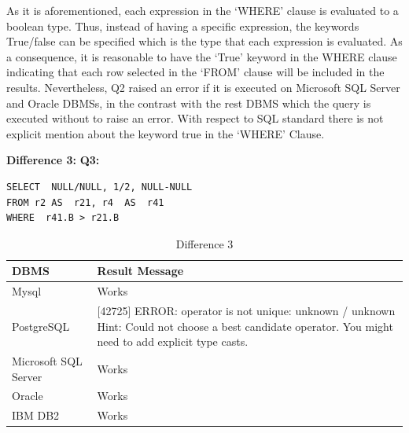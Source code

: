 As it is aforementioned, each expression in the ‘WHERE’ clause is evaluated to a boolean type. Thus, instead of having a specific expression, the keywords True/false can be specified which is the type that each expression is evaluated. As a consequence, it is reasonable to have the ‘True’ keyword in the WHERE clause indicating that each row selected in the ‘FROM’ clause will be included in the results. Nevertheless, Q2 raised an error if it is executed on Microsoft SQL  Server and Oracle DBMSs, in the contrast with the rest DBMS which the query is executed without to raise an error. With respect to SQL standard there is not explicit mention about the keyword true in the ‘WHERE’ Clause. 

\hfill\newpage

\hfill\newline\textbf{Difference 3:}
\hfill\newline\textbf{Q3:}
\begin{mdframed}[backgroundcolor=lightgray!20]
\begin{lstlisting}[style=SQL]
SELECT  NULL/NULL, 1/2, NULL-NULL
FROM r2 AS  r21, r4  AS  r41
WHERE  r41.B > r21.B 
\end{lstlisting}
\end{mdframed}

\begin{table}[h]
\centering
\caption{Difference 3}
\label{my-label}
\begin{tabular}{|p{2cm}|p{11.5cm}| }
\hline
\textbf{DBMS} & \textbf{Result Message}                                                                                                                                   \\ \hline
Mysql         & Works                                                                                                                                                     \\ \hline
PostgreSQL    & {[}42725{]} ERROR: operator is not unique: unknown / unknown Hint: Could not choose a best candidate operator. You might need to add explicit type casts. \\ \hline
Microsoft SQL Server     & Works                                                                                                                                                     \\ \hline
Oracle        & Works                                                                                                                                                     \\ \hline
IBM DB2       & Works                                                                                                                                                     \\ \hline
\end{tabular}
\end{table}


